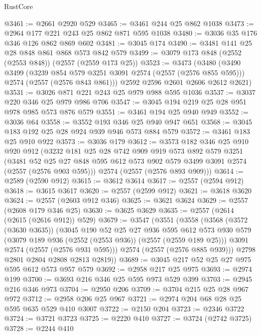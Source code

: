 \begin{lexlean}{RustCore}
\begin{coremodule}
@3461 := @2661 @2920 @529
@3465 := @3461 @244 @25 @862 @1038
@3473 := @2964 @177 @221 @243 @25 @862 @871 @595 @1038
@3480 := @3036 @35 @176 @346 @126 @862 @869 @602
@3481 := @3045 @174
@3490 := @3481 @141 @25 @28 @848 @861 @868 @573 @842 @579
@3499 := @3079 @173 @848 (@2552 (@2553 @848)) (@2557 (@2559 @173 @25))
@3523 := @3473
    (@3480
      (@3490
        @3499
        (@3239 @854 @579 @3251 @3091 @2574 (@2557 (@2576 @855 @595)))
        @2574
        (@2557 (@2576 @843 @861)))
      @2592
      @2596
      @2601
      @2606
      @2612
      @2621)
@3531 := @3026 @871 @221 @243 @25 @979 @988 @595 @1036
@3537 := @3037 @220 @346 @25 @979 @986 @706
@3547 := @3045 @194 @219 @25 @28 @951 @978 @985 @573 @876 @579
@3551 := @3461 @194 @25 @940 @949
@3552 := @3036 @64
@3558 := @3552 @193 @346 @25 @940 @947 @651
@3568 := @3045 @183 @192 @25 @28 @924 @939 @946 @573 @884 @579
@3572 := @3461 @183 @25 @910 @922
@3573 := @3036 @179
@3612 := @3573
    @182
    @346
    @25
    @910
    @920
    @912
    (@3232
      @181
      @25
      @28
      @742
      @909
      @919
      @573
      @892
      @579
      @3251
      (@3481 @52 @25 @27 @848 @595 @612 @573 @902 @579 @3499 @3091 @2574 (@2557 (@2576 @903 @595)))
      @2574
      (@2557 (@2576 @893 @909)))
@3614 := @2589 (@2590 @912)
@3615 := @3612 @3614
@3617 := @2557 (@2594 @912)
@3618 := @3615 @3617
@3620 := @2557 (@2599 @912)
@3621 := @3618 @3620
@3624 := @2557 (@2603 @912 @346)
@3625 := @3621 @3624
@3629 := @2557 (@2608 @179 @346 @25)
@3630 := @3625 @3629
@3635 := @2557 (@2614 (@2615 (@2616 @912)) @529)
@3679 := @3547
    (@3551
      (@3558
        (@3568
          (@3572 (@3630 @3635))
          (@3045
            @190
            @52
            @25
            @27
            @936
            @595
            @612
            @573
            @930
            @579
            (@3079 @189 @936 (@2552 (@2553 @936)) (@2557 (@2559 @189 @25)))
            @3091
            @2574
            (@2557 (@2576 @931 @595)))
          @2574
          (@2557 (@2576 @885 @939)))
        @2798
        @2801
        @2804
        @2808
        @2813
        @2819))
@3689 := @3045 @217 @52 @25 @27 @975 @595 @612 @573 @957 @579
@3692 := @2958 @217 @25 @975
@3693 := @2974 @199
@3700 := @3693 @216 @346 @25 @595 @973 @529 @399
@3703 := @2945 @216 @346 @973
@3704 := @2950 @206
@3709 := @3704 @215 @25 @28 @967 @972
@3712 := @2958 @206 @25 @967
@3721 := @2974 @204 @68 @28 @25 @595 @635 @529 @410 @3007
@3722 := @2150 @204
@3723 := @2346 @3722
@3724 := @3721 @3723
@3725 := @2220 @410
@3727 := @3724 (@2742 @3725)
@3728 := @2244 @410

\end{coremodule}
\end{lexlean}
